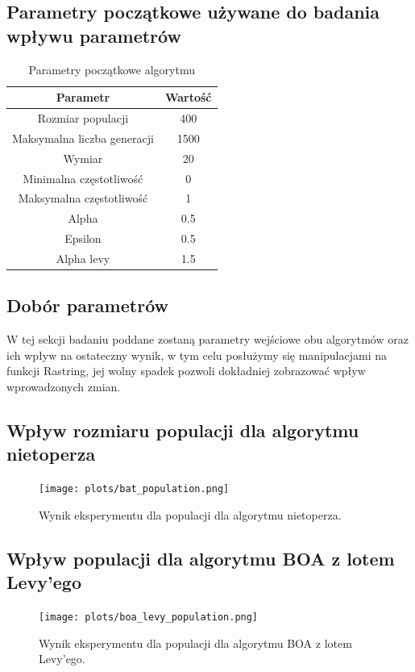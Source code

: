 \subsection{Parametry początkowe używane do badania wpływu parametrów}

\begin{table}[htbp]
\centering
\caption{Parametry początkowe algorytmu}
\label{tab:params}
\begin{tabular}{|c|c|}
\hline
Parametr & Wartość \\
\hline
Rozmiar populacji & 400 \\
Maksymalna liczba generacji & 1500 \\
Wymiar & 20 \\
Minimalna częstotliwość & 0 \\
Maksymalna częstotliwość & 1 \\
Alpha & 0.5 \\
Epsilon & 0.5 \\
Alpha levy & 1.5 \\
\hline
\end{tabular}
\end{table}

\subsection{Dobór parametrów}

W tej sekcji badaniu poddane zostaną parametry wejściowe obu algorytmów oraz ich wpływ na ostateczny wynik, w tym celu posłużymy się manipulacjami na funkcji Rastring, jej wolny spadek pozwoli dokładniej zobrazować wpływ wprowadzonych zmian.

\subsection{Wpływ rozmiaru populacji dla algorytmu nietoperza}

\begin{figure}[H]
\centering
\texttt{[image: plots/bat\_population.png]}
\caption{Wynik eksperymentu dla populacji dla algorytmu nietoperza.}
\label{fig:population_bat}
\end{figure}

\subsection{Wpływ populacji dla algorytmu BOA z lotem Levy’ego}

\begin{figure}[H]
\centering
\texttt{[image: plots/boa\_levy\_population.png]}
\caption{Wynik eksperymentu dla populacji dla algorytmu BOA z lotem Levy’ego.}
\label{fig:population_levy}
\end{figure}

